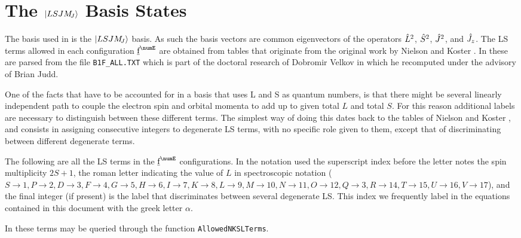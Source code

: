 \documentclass{article}
\newcommand{\codetext}[1]{{\color{BlueViolet} \texttt{#1}}}
\begin{document}
\section{The $|LSJM_{\!{J}}\rangle$ Basis States}

The basis used in \qlanth is the $|LSJM_{\!{J}}\rangle$ basis. As such the basis vectors are common eigenvectors of the operators $\hat{L}^2$, $\hat{S}^2$, $\hat{J}^2$, and $\hat{J}_z$. The LS terms allowed in each configuration $\forb^\numE$ are obtained from tables that originate from the original work by Nielson and Koster \cite{nielson_spectroscopic_1963}. In \qlanth these are parsed from the file \codetext{B1F\_ALL.TXT} which is part of the doctoral research of Dobromir Velkov \cite{velkov_multi-electron_2000} in which he recomputed \cfps under the advisory of Brian Judd. 

One of the facts that have to be accounted for in a basis that uses L and S as quantum numbers, is that there might be several linearly independent path to couple the electron spin and orbital momenta to add up to given total $L$ and total $S$. For this reason additional labels are necessary to distinguish between these different terms. The simplest way of doing this dates back to the tables of Nielson and Koster \cite{nielson_spectroscopic_1963}, and consists in assigning consecutive integers to degenerate LS terms, with no specific role given to them, except that of discriminating between different degenerate terms. 
 
The following are all the LS terms in the $\forb^{\numE}$ configurations. In the notation used the superscript index before the letter notes the spin multiplicity $2S+1$, the roman letter indicating the value of $L$ in spectroscopic notation ($S\!\!\rightarrow\!\!1, P\!\!\rightarrow\!\!2, D\!\!\rightarrow\!\!3, F\!\!\rightarrow\!\!4, G\!\!\rightarrow\!\!5, H\!\!\rightarrow\!\!6, I\!\!\rightarrow\!\!7, K\!\!\rightarrow\!\!8, L\!\!\rightarrow\!\!9, M\!\!\rightarrow\!\!10, N\!\!\rightarrow\!\!11, O\!\!\rightarrow\!\!12, Q\!\!\rightarrow\!\!3, R\!\!\rightarrow\!\!14, T\!\!\rightarrow\!\!15, U\!\!\rightarrow\!\!16, V\!\!\rightarrow\!\!17$), and the final integer (if present) is the label that discriminates between several degenerate LS. This index we frequently label in the equations contained in this document with the greek letter $\alpha$.

   
 
In \qlanth these terms may be queried through the function \codetext{AllowedNKSLTerms}. 
\end{document}
